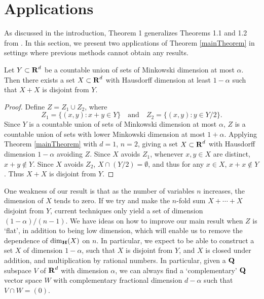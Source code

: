 \section{Applications}\label{applications}

As discussed in the introduction, Theorem 1 generalizes Theorems 1.1 and 1.2 from \cite{MalabikaRob}. In this section, we present two applications of Theorem \ref{mainTheorem} in settings where previous methods cannot obtain any results.

\begin{theorem}
	Let $Y \subset \operatorname{\mathbf{R}}^d$ be a countable union of sets of Minkowski dimension at most $\alpha$. Then there exists a set $X \subset \operatorname{\mathbf{R}}^d$ with Hausdorff dimension at least $1 - \alpha$ such that $X + X$ is disjoint from $Y$.
\end{theorem}
\begin{proof}
	Define $Z = Z_1 \cup Z_2$, where
	\[ Z_1 = \{ (x,y) : x + y \in Y \} \quad \text{and} \quad Z_2 = \{ (x,y): y \in Y/2 \}. \]
	Since $Y$ is a countable union of sets of Minkowski dimension at most $\alpha$, $Z$ is a countable union of sets with lower Minkowski dimension at most $1 + \alpha$. Applying Theorem \ref{mainTheorem} with $d = 1$, $n = 2$, giving a set $X \subset \operatorname{\mathbf{R}}^d$ with Hausdorff dimension $1 - \alpha$ avoiding $Z$. Since $X$ avoids $Z_1$, whenever $x,y \in X$ are distinct, $x + y \not \in Y$. Since $X$ avoids $Z_2$, $X \cap (Y/2) = \emptyset$, and thus for any $x \in X$, $x + x \not \in Y$. Thus $X + X$ is disjoint from $Y$.
\end{proof}

\begin{remark}
	One weakness of our result is that as the number of variables $n$ increases, the dimension of $X$ tends to zero. If we try and make the $n$-fold sum $X + \cdots + X$ disjoint from $Y$, current techniques only yield a set of dimension $(1 - \alpha)/(n-1)$. We have ideas on how to improve our main result when $Z$ is `flat', in addition to being low dimension, which will enable us to remove the dependence of $\operatorname{\dim_{\mathbf{H}}}(X)$ on $n$. In particular, we expect to be able to construct a set $X$ of dimension $1 - \alpha$, such that $X$ is disjoint from $Y$, and $X$ is closed under addition, and multiplication by rational numbers. In particular, given a $\operatorname{\mathbf{Q}}$ subspace $V$ of $\operatorname{\mathbf{R}}^d$ with dimension $\alpha$, we can always find a `complementary' $\operatorname{\mathbf{Q}}$ vector space $W$ with complementary fractional dimension $d - \alpha$ such that $V \cap W = (0)$.
\end{remark}

